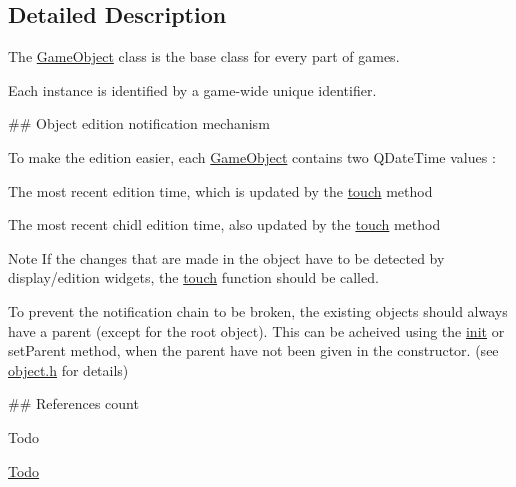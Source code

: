 \subsection{\-Detailed \-Description}
\-The \hyperlink{class_game_object}{\-Game\-Object} class is the base class for every part of games. 

\-Each instance is identified by a game-\/wide unique identifier.

\#\# \-Object edition notification mechanism

\-To make the edition easier, each \hyperlink{class_game_object}{\-Game\-Object} contains two \-Q\-Date\-Time values \-:
\begin{DoxyItemize}
\item \-The most recent edition time, which is updated by the \hyperlink{class_game_object_a2130d5674df041b5a7eaf987f9b1e642}{touch} method
\item \-The most recent chidl edition time, also updated by the \hyperlink{class_game_object_a2130d5674df041b5a7eaf987f9b1e642}{touch} method
\end{DoxyItemize}

\begin{DoxyNote}{\-Note}
\-If the changes that are made in the object have to be detected by display/edition widgets, the \hyperlink{class_game_object_a2130d5674df041b5a7eaf987f9b1e642}{touch} function should be called. 

\-To prevent the notification chain to be broken, the existing objects should always have a parent (except for the root object). \-This can be acheived using the \hyperlink{class_game_object_a97be7b59b2e76e7d60de2146b894eed9}{init} or set\-Parent method, when the parent have not been given in the constructor. (see \hyperlink{object_8h}{object.\-h} for details)
\end{DoxyNote}
\#\# \-References count

\begin{DoxyRefDesc}{\-Todo}
\item[\hyperlink{todo__todo000001}{\-Todo}]\end{DoxyRefDesc}


